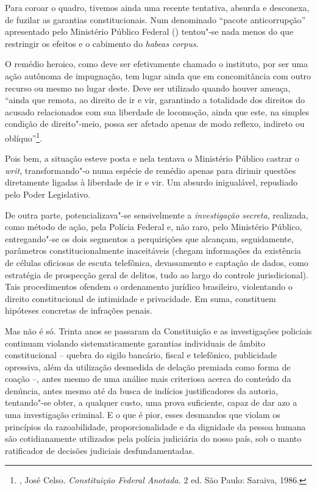 Para coroar o quadro, tivemos ainda uma recente tentativa, absurda e
desconexa, de fuzilar as garantias constitucionais. Num denominado
``pacote anticorrupção'' apresentado pelo Ministério Público Federal
() tentou"-se nada menos do que restringir os efeitos e o cabimento do
\emph{habeas corpus}.

O remédio heroico, como deve ser efetivamente chamado o instituto, por
ser uma ação autônoma de impugnação, tem lugar ainda que em
concomitância com outro recurso ou mesmo no lugar deste. Deve ser
utilizado quando houver ameaça, ``ainda que remota, ao direito de ir e
vir, garantindo a totalidade dos direitos do acusado relacionados com sua
liberdade de locomoção, ainda que este, na simples condição de
direito"-meio, possa ser afetado apenas de modo reflexo, indireto ou
oblíquo''\footnote{ , José Celso. \emph{Constituição Federal
  Anotada.} 2 ed. São Paulo: Saraiva, 1986.}.

Pois bem, a situação esteve posta e nela tentava o Ministério Público
castrar o \emph{writ}, transformando"-o numa espécie de remédio apenas
para dirimir questões diretamente ligadas à liberdade de ir e vir. Um
absurdo inigualável, repudiado pelo Poder Legislativo.

De outra parte, potencializava"-se sensivelmente a \emph{investigação
secreta}, realizada, como método de ação, pela Polícia Federal e, não
raro, pelo Ministério Público, entregando"-se os dois segmentos a
perquirições que alcançam, seguidamente, parâmetros constitucionalmente
inaceitáveis (chegam informações da existência de células oficiosas de
escuta telefônica, devassamento e captação de dados, como estratégia de
prospecção geral de delitos, tudo ao largo do controle jurisdicional).
Tais procedimentos ofendem o ordenamento jurídico brasileiro,
violentando o direito constitucional de intimidade e privacidade. Em
suma, constituem hipóteses concretas de infrações penais.

Mas não é só. Trinta anos se passaram da Constituição e as investigações
policiais continuam violando sistematicamente garantias individuais de
âmbito constitucional -- quebra do sigilo bancário, fiscal e telefônico,
publicidade opressiva, além da utilização desmedida de delação premiada
como forma de coação --, antes mesmo de uma análise mais criteriosa
acerca do conteúdo da denúncia, antes mesmo até da busca de indícios
justificadores da autoria, tentando"-se obter, a qualquer custo, uma
prova suficiente, capaz de dar azo a uma investigação criminal. E o que
é pior, esses desmandos que violam os princípios da razoabilidade,
proporcionalidade e da dignidade da pessoa humana são cotidianamente
utilizados pela polícia judiciária do nosso país, sob o manto
ratificador de decisões judiciais desfundamentadas.

